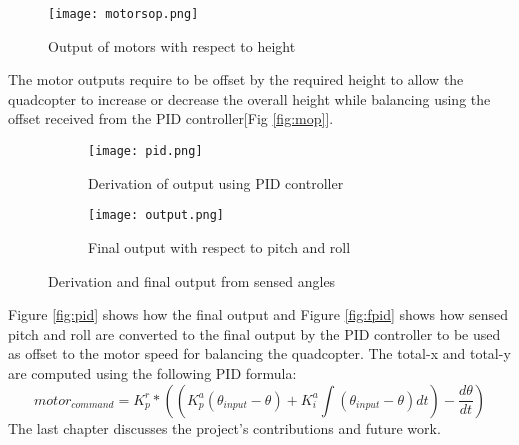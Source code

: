 \begin{figure}[H]
  \centering
  \texttt{[image: motorsop.png]}
  \caption{Output of motors with respect to height\label{fig:mop}}
  \label{Motor output}  
\end{figure}
The motor outputs require to be offset by the required height to allow the quadcopter to increase or decrease the overall height while balancing using the offset received from the PID controller[Fig \ref{fig:mop}].

\begin{figure}[H]
  \begin{subfigure}{1\textwidth}
    \centering
    \texttt{[image: pid.png]}
    \caption{Derivation of output using PID controller\label{fig:pid}}
    \label{Motor output}  
  \end{subfigure}
  \begin{subfigure}{1\textwidth}
    \centering
    \texttt{[image: output.png]}
    \caption{Final output with respect to pitch and roll\label{fig:fpid}}
    \label{Measurement of pitch and roll} 
  \end{subfigure}
  \caption{Derivation and final output from sensed angles}
\end{figure}
Figure \ref{fig:pid} shows how the final output and Figure \ref{fig:fpid} shows how sensed pitch and roll are converted to the final output by the PID controller to be used as offset to the motor speed for balancing the quadcopter. The total-x and total-y are computed using the following PID formula:
\begin{equation}
motor_{command} = K_p^r*((K_p^a(\theta_{input} - \theta) + K_i^a\int (\theta_{input} - \theta)dt) -\frac{d\theta}{dt})
\end{equation}
\newline
The last chapter discusses the project's contributions and future work.
